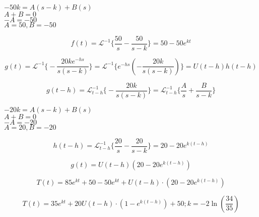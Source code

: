\begin{center}
$-50k = A(s-k) + B(s)$\\ 
\vspace{8pt}
$A + B = 0$\\ 
\vspace{8pt}
$-A = -50$\\ 
\vspace{8pt}
$A = 50, B = -50$\\ 
\vspace{8pt}

\begin{equation*}
    f(t) = \mathscr{L}^{-1} \biggl\{ \frac{50}{s} - \frac{50}{s-k} \biggr\} = 50 - 50e^{kt}
\end{equation*}

\begin{equation*}
    g(t) = \mathscr{L}^{-1} \biggl\{ -\frac{20ke^{-hs}}{s(s-k)} \biggr\} = \mathscr{L}^{-1} \biggl\{ e^{-hs}\left(-\frac{20k}{s(s-k)}\right) \biggr\} = U(t-h)h(t-h)
\end{equation*}

\begin{equation*}
    g(t-h) = \mathscr{L}_{t-h}^{-1} \biggl\{ -\frac{20k}{s(s-k)} \biggr\} = \mathscr{L}_{t-h}^{-1} \biggl\{ \frac{A}{s} + \frac{B}{s-k} \biggr\}
\end{equation*}

$-20k = A(s-k) + B(s)$\\ 
\vspace{8pt}
$A + B = 0 $\\ 
\vspace{8pt}
$-A = -20$\\ 
\vspace{8pt}
$A = 20, B = -20$

\begin{equation*}
    h(t-h) = \mathscr{L}_{t-h}^{-1} \biggl\{ \frac{20}{s} - \frac{20}{s-k} \biggr\} = 20 - 20e^{k(t-h)}
\end{equation*}

\begin{equation*}
    g(t) = U(t-h)\left( 20 - 20e^{k(t-h)}\right)
\end{equation*}

\begin{equation*}
    T(t) = 85e^{kt} + 50 - 50e^{kt} + U(t-h)\cdot\left( 20 - 20e^{k(t-h)}\right)
\end{equation*}

\begin{equation*}
    T(t) = 35e^{kt} + 20U(t-h)\cdot\left( 1 - e^{k(t-h)}\right) + 50; k = -2\ln{\left(\frac{34}{35}\right)}
\end{equation*}
\end{center}